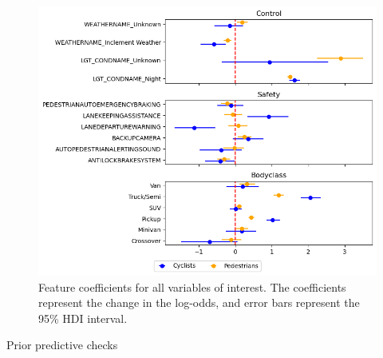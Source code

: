 \documentclass[12pt]{article}
\begin{document}
\begin{figure}
    \centering
    \includegraphics[width=\textwidth]{images/feature_coefficients.png}
    \caption{Feature coefficients for all variables of interest. The coefficients represent the change in the log-odds,
        and error bars represent the 95\% HDI interval.}
    \label{fig:coefficients}
\end{figure}


Prior predictive checks

\printbibliography
\end{document}
